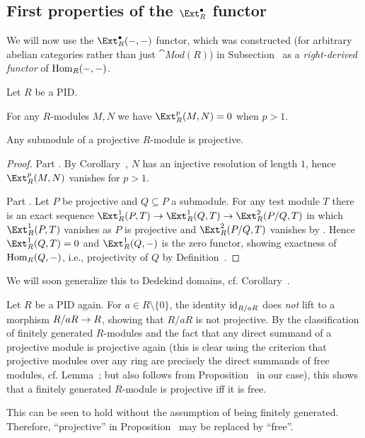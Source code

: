 \documentclass[a4paper,parskip=half,numbers=enddot, DIV=12]{scrreprt}
\begin{document}
\subsection{First properties of the \texorpdfstring{$\Ext_R^\bullet$}{Ext} functor}
We will now use the $\Ext_R^\bullet(-,-)$ functor, which was constructed (for arbitrary abelian categories rather than just $\cat{Mod}(R)$) in Subsection~ as a \emph{right-derived functor} of $\operatorname{Hom}_R(-,-)$.
\begin{prop}
	Let $R$ be a PID.
	\begin{alphanumerate}
		\item For any $R$-modules $M,N$ we have $\Ext_R^p(M,N)=0$ when $p>1$.
		\item Any submodule of a projective $R$-module is projective.
	\end{alphanumerate}
\end{prop}
\begin{proof}
	Part . By Corollary~, $N$ has an injective resolution of length $1$, hence $\Ext_R^p(M,N)$ vanishes for $p>1$.
	
	Part . Let $P$ be projective and $Q\subseteq P$ a submodule. For any test module $T$ there is an exact sequence $\Ext_R^1(P,T)\morphism\Ext_R^1(Q,T)\morphism\Ext_R^2(P/Q,T)$ in which $\Ext_R^1(P,T)$ vanishes as $P$ is projective and $\Ext_R^2(P/Q,T)$ vanishes by . Hence $\Ext_R^1(Q,T)=0$ and $\Ext_R^1(Q,-)$ is the zero functor, showing exactness of $\operatorname{Hom}_R(Q,-)$, i.e., projectivity of $Q$ by Definition~.
\end{proof}
\begin{rem*}
	\begin{alphanumerate}
		\item We will soon generalize this to Dedekind domains, cf. Corollary~.
		\item Let $R$ be a PID again. For $a\in R\setminus \{0\}$, the identity $\operatorname{id}_{R/aR}$ does \emph{not} lift to a morphism $R/aR\morphism R$, showing that $R/aR$ is not projective. By the classification of finitely generated $R$-modules and the fact that any direct summand of a projective module is projective again (this is clear using the criterion that projective modules over any ring are precisely the direct summands of free modules, cf. Lemma~; but also follows from Proposition~ in our case), this shows that a finitely generated $R$-module is projective iff it is free.
		
		This can be seen to hold without the assumption of being finitely generated. Therefore, ``projective'' in Proposition~ may be replaced by ``free''.
	\end{alphanumerate}
\end{rem*}
\end{document}
